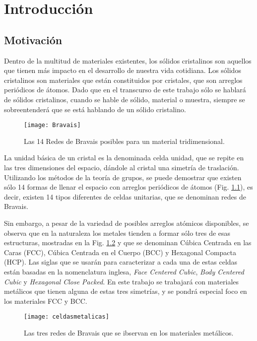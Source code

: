 \chapter{Introducción}
\graphicspath{{./figs/01_intro/}}
\section{Motivación}\label{S:motivacion}
Dentro de la multitud de materiales existentes, los sólidos cristalinos son aquellos que tienen más impacto en el desarrollo de nuestra vida cotidiana. 
Los sólidos cristalinos son materiales que están constituidos por cristales, que son arreglos periódicos de átomos. 
Dado que en el transcurso de este trabajo sólo se hablará de sólidos cristalinos, cuando se hable de sólido, material o muestra, siempre se sobreentenderá que se está hablando de un sólido cristalino.

\begin{figure}[h!]
  \centering
  \texttt{[image: Bravais]}
  \caption{Las 14 Redes de Bravais posibles para un material tridimensional.}
  \label{fig:Bravais}
\end{figure}

La unidad básica de un cristal es la denominada celda unidad, que se repite en las tres dimensiones del espacio, dándole al cristal una simetría de traslación. Utilizando los métodos de la teoría de grupos, se puede demostrar que existen sólo 14 formas de llenar el espacio con arreglos periódicos de átomos (Fig. \ref{fig:Bravais}), es decir, existen 14 tipos diferentes de celdas unitarias, que se denominan redes de Bravais\cite{hahn2005international}.

Sin embargo, a pesar de la variedad de posibles arreglos atómicos disponibles, se observa que en la naturaleza los metales tienden a formar sólo tres de esas estructuras, mostradas en la Fig. \ref{fig:celdasmetalicas} y que se denominan Cúbica Centrada en las Caras (FCC), Cúbica Centrada en el Cuerpo (BCC) y Hexagonal Compacta (HCP). Las siglas que se usarán para caracterizar a cada una de estas celdas están basadas en la nomenclatura inglesa, \textit{Face Centered Cubic}, \textit{Body Centered Cubic} y \textit{Hexagonal Close Packed}. En este trabajo se trabajará con materiales metálicos que tienen alguna de estas tres simetrías, y se pondrá especial foco en los materiales FCC y BCC.

\begin{figure}[h!]
  \centering
  \texttt{[image: celdasmetalicas]}
  \caption{Las tres redes de Bravais que se ibservan en los materiales metálicos.}
  \label{fig:celdasmetalicas}
\end{figure}


